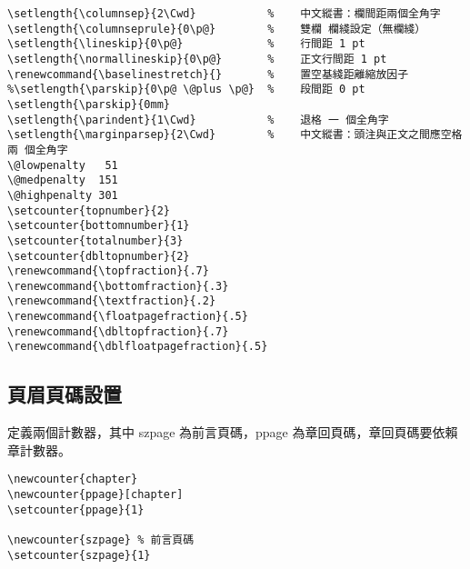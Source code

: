 \begin{lstlisting}[firstnumber=397]
\setlength{\columnsep}{2\Cwd}           %    中文縱書：欄間距兩個全角字
\setlength{\columnseprule}{0\p@}        %    雙欄 欄綫設定（無欄綫）
\setlength{\lineskip}{0\p@}             %    行間距 1 pt
\setlength{\normallineskip}{0\p@}       %    正文行間距 1 pt
\renewcommand{\baselinestretch}{}       %    置空基綫距離縮放因子
%\setlength{\parskip}{0\p@ \@plus \p@}  %    段間距 0 pt
\setlength{\parskip}{0mm}
\setlength{\parindent}{1\Cwd}           %    退格 一 個全角字
\setlength{\marginparsep}{2\Cwd}        %    中文縱書：頭注與正文之間應空格 兩 個全角字
\@lowpenalty   51
\@medpenalty  151
\@highpenalty 301
\setcounter{topnumber}{2}
\setcounter{bottomnumber}{1}
\setcounter{totalnumber}{3}
\setcounter{dbltopnumber}{2}
\renewcommand{\topfraction}{.7}
\renewcommand{\bottomfraction}{.3}
\renewcommand{\textfraction}{.2}
\renewcommand{\floatpagefraction}{.5}
\renewcommand{\dbltopfraction}{.7}
\renewcommand{\dblfloatpagefraction}{.5}
\end{lstlisting}

\subsection{頁眉頁碼設置 }

\par 定義兩個計數器，其中 szpage 為前言頁碼，ppage 為章回頁碼，章回頁碼要依賴章計數器。
\begin{lstlisting}[firstnumber=420]
% 引入計數器
\newcounter{chapter}
\newcounter{ppage}[chapter]
\setcounter{ppage}{1}

\newcounter{szpage} % 前言頁碼
\setcounter{szpage}{1}
\end{lstlisting}

